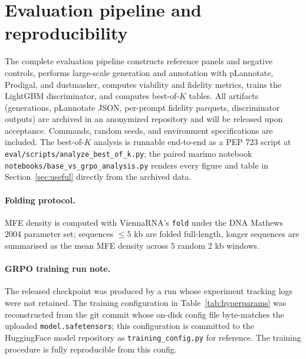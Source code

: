 \documentclass{article}
\begin{document}
\section{Evaluation pipeline and reproducibility}
\label{app:pipeline}

The complete evaluation pipeline constructs reference panels and negative controls,
performs large-scale generation and annotation with pLannotate, Prodigal, and dustmasker,
computes viability and fidelity metrics, trains the LightGBM discriminator, and computes
best-of-$K$ tables. All artifacts (generations, pLannotate JSON, per-prompt fidelity
parquets, discriminator outputs) are archived in an anonymized repository and will be
released upon acceptance. Commands, random seeds, and environment specifications are
included. The best-of-$K$ analysis is runnable end-to-end as a PEP 723 script at
\texttt{eval/scripts/analyze\_best\_of\_k.py}; the paired marimo notebook
\texttt{notebooks/base\_vs\_grpo\_analysis.py} renders every figure and table in
Section~\ref{sec:useful} directly from the archived data.

\paragraph{Folding protocol.} MFE density is computed with ViennaRNA's
\texttt{fold} under the DNA Mathews 2004 parameter set; sequences $\le 5$ kb are
folded full-length, longer sequences are summarised as the mean MFE density across $5$
random $2$ kb windows.

\paragraph{GRPO training run note.} The released checkpoint was produced by a run whose
experiment tracking logs were not retained. The training configuration in
Table~\ref{tab:hyperparams} was reconstructed from the git commit whose on-disk config
file byte-matches the uploaded \texttt{model.safetensors}; this configuration is
committed to the HuggingFace model repository as \texttt{training\_config.py} for
reference. The training procedure is fully reproducible from this config.


\newpage

\end{document}
